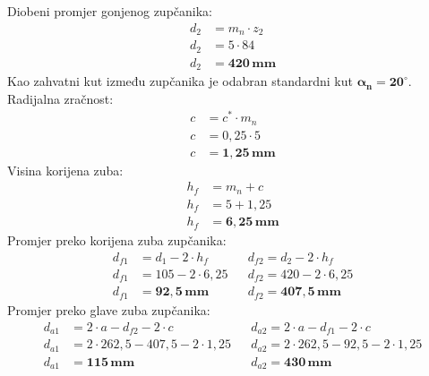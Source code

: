 \documentclass[11pt,a4paper]{report}
\begin{document}
Diobeni promjer gonjenog zupčanika:
\begin{align*}
d_2&=m_n \cdot z_2\\
d_2&=5 \cdot 84\\
d_2&=\mathbf{420 \,mm}
\end{align*}
Kao zahvatni kut između zupčanika je odabran standardni kut $\mathbf{\alpha_n=20^\circ}$.
Radijalna zračnost:
\begin{align*}
c&=c^* \cdot m_n\\
c&=0,25 \cdot 5\\
c&= \mathbf{1,25 \, mm}
\end{align*}
Visina korijena zuba:
\begin{align*}
h_f&=m_n+c\\
h_f&=5+1,25\\
h_f&=\mathbf{6,25 \,mm}
\end{align*}
Promjer preko korijena zuba zupčanika:
\begin{align*}
d_{f1}&=d_1-2 \cdot h_f && d_{f2}=d_2-2 \cdot h_f\\
d_{f1}&=105-2 \cdot 6,25 && d_{f2}=420-2 \cdot 6,25\\
d_{f1}&=\mathbf{92,5 \,mm} && d_{f2}=\mathbf{407,5 \,mm}
\end{align*}
Promjer preko glave zuba zupčanika:
\begin{align*}
d_{a1}&=2 \cdot a - d_{f2} - 2 \cdot c  && d_{a2}=2 \cdot a - d_{f1} - 2 \cdot c\\
d_{a1}&=2 \cdot 262,5 - 407,5 - 2 \cdot 1,25 && d_{a2}=2 \cdot 262,5 - 92,5 - 2 \cdot 1,25\\
d_{a1}&=\mathbf{115 \,mm} && d_{a2}=\mathbf{430 \,mm}
\end{align*}
\end{document}
